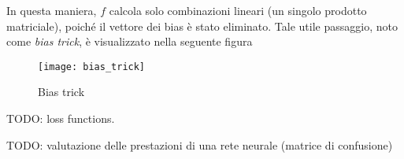 In questa maniera, $f$ calcola solo combinazioni lineari (un singolo prodotto matriciale), poiché il vettore dei bias è stato eliminato.
Tale utile passaggio, noto come \textit{bias trick}, è visualizzato nella seguente figura

\begin{figure}[h]
\centering
\texttt{[image: bias\_trick]}
\caption{Bias trick}
\label{bias_trick}
\end{figure}

TODO: loss functions.

TODO: valutazione delle prestazioni di una rete neurale (matrice di confusione)


